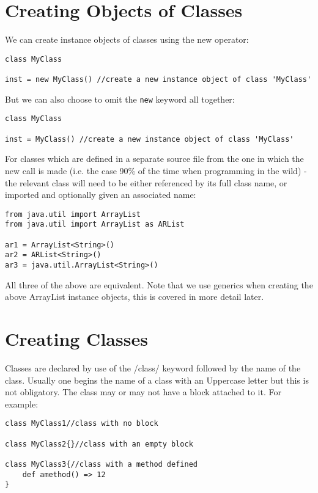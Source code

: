 \documentclass[conc-doc]{subfiles}
\begin{document}
\section{Creating Objects of Classes}
We can create instance objects of classes using the new operator:

\begin{lstlisting}
class MyClass

inst = new MyClass() //create a new instance object of class 'MyClass'
\end{lstlisting}

But we can also choose to omit the \lstinline{new} keyword all together:

\begin{lstlisting}
class MyClass

inst = MyClass() //create a new instance object of class 'MyClass'
\end{lstlisting}

For classes which are defined in a separate source file from the one in which the new call is made (i.e. the case 90\% of the time when programming in the wild) - the relevant class will need to be either referenced by its full class name, or imported and optionally given an associated name:

\begin{lstlisting}
from java.util import ArrayList
from java.util import ArrayList as ARList

ar1 = ArrayList<String>()
ar2 = ARList<String>()
ar3 = java.util.ArrayList<String>()
\end{lstlisting}

All three of the above are equivalent. Note that we use generics when creating the above ArrayList instance objects, this is covered in more detail later.

\section{Creating Classes}
Classes are declared by use of the /class/ keyword followed by the name of the class. Usually one begins the name of a class with an Uppercase letter but this is not obligatory. The class may or may not have a block attached to it. For example:

\begin{lstlisting}
class MyClass1//class with no block

class MyClass2{}//class with an empty block

class MyClass3{//class with a method defined
	def amethod() => 12
}
\end{lstlisting}
\end{document}
